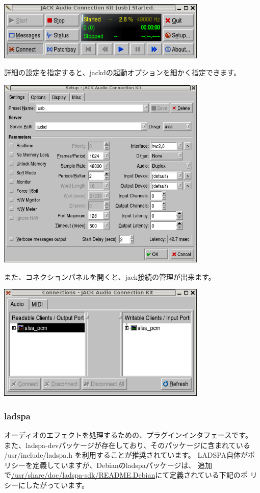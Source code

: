 \documentclass[mingoth,a4paper]{jsarticle}
\begin{document}
\includegraphics[width=10cm]{image200602/qjackctl-1.png}

詳細の設定を指定すると、jackdの起動オプションを細かく指定できます。

\includegraphics[width=10cm]{image200602/qjackctl-0.png}

また、コネクションパネルを開くと、jack接続の管理が出来ます。

\includegraphics[width=10cm]{image200602/qjackctl-2.png}

\subsubsection{ladspa}

オーディオのエフェクトを処理するための、プラグインインタフェースです。
また、ladspa-devパッケージが存在しており、そのパッケージに含まれている
/usr/include/ladspa.h を利用することが推奨されています。
LADSPA自体がポリシーを定義していますが、Debianのladspaパッケージは、
追加で\url{/usr/share/doc/ladspa-sdk/README.Debian}にて定義されている下記のポ
リシーにしたがっています。
\end{document}
